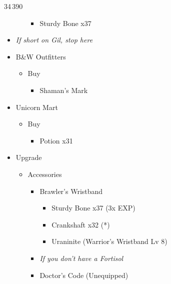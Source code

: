 \begin{multicols}{2}
\begin{shop}{34\,390}
\begin{itemize}
\begin{itemize}
\begin{itemize}
                      \item Sturdy Bone x37
                    \end{itemize}
            \end{itemize}
      \item \textit{If short on Gil, stop here}
      \item B\&W Outfitters
            \begin{itemize}
              \item Buy
                    \begin{itemize}
                      \item Shaman's Mark
                    \end{itemize}
            \end{itemize}
      \item Unicorn Mart
            \begin{itemize}
              \item Buy
                    \begin{itemize}
                      \item Potion x31
                    \end{itemize}
            \end{itemize}
    \end{itemize}
  \end{shop}
  \begin{upgrade}
    \begin{itemize}
      \item Upgrade
            \begin{itemize}
              \item Accessories
                    \begin{itemize}
                      \item Brawler's Wristband
                            \begin{itemize}
                              \item Sturdy Bone x37 (3x EXP)
                              \item Crankshaft x32 (*)
                              \item Uraninite (Warrior's Wristband Lv 8)
                            \end{itemize}
                      \item \textit{If you don't have a Fortisol}
                      \item Doctor's Code (Unequipped)
                            \begin{itemize}

\end{itemize}
\end{itemize}
\end{itemize}
\end{itemize}
\end{upgrade}
\end{multicols}
